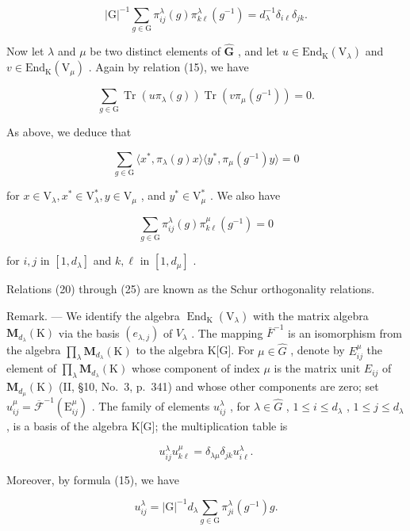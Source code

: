 \[
| \mathrm{G} | ^ {- 1} \sum_ {g \in \mathrm{G}} \pi_ {i j} ^ {\lambda} (g) \pi_ {k \ell} ^ {\lambda} (g ^ {- 1}) = d _ {\lambda} ^ {- 1} \delta_ {i \ell} \delta_ {j k}.\tag{22}
\]

Now let \(\lambda\) and \(\mu\) be two distinct elements of \(\widehat{\mathbf{G}}\) , and let \(u \in \mathrm{End}_{\mathrm{K}}(\mathrm{V}_{\lambda})\) and \(v \in \mathrm{End}_{\mathrm{K}}(\mathrm{V}_{\mu})\) . Again by relation (15), we have

\[
\sum_ {g \in \mathrm{G}} \operatorname{Tr} (u \pi_ {\lambda} (g)) \operatorname{Tr} (v \pi_ {\mu} (g ^ {- 1})) = 0.\tag{23}
\]

As above, we deduce that

\[
\sum_ {g \in \mathrm{G}} \langle x ^ {*}, \pi_ {\lambda} (g) x \rangle \langle y ^ {*}, \pi_ {\mu} (g ^ {- 1}) y \rangle = 0\tag{24}
\]

for \(x\in \mathrm{V}_{\lambda},x^{*}\in \mathrm{V}_{\lambda}^{*},y\in \mathrm{V}_{\mu}\) , and \(y^{*}\in \mathrm{V}_{\mu}^{*}\) . We also have

\[
\sum_ {g \in \mathrm{G}} \pi_ {i j} ^ {\lambda} (g) \pi_ {k \ell} ^ {\mu} (g ^ {- 1}) = 0\tag{25}
\]

for \(i,j\) in \([1,d_{\lambda}]\) and \(k,\ell\) in \([1,d_{\mu}]\) .

Relations (20) through (25) are known as the Schur orthogonality relations.

Remark. --- We identify the algebra \(\operatorname{End}_{\mathrm{K}}(\mathrm{V}_{\lambda})\) with the matrix algebra \(\mathbf{M}_{d_{\lambda}}(\mathrm{K})\) via the basis \((e_{\lambda,j})\) of \(V_{\lambda}\) . The mapping \(\overline{F}^{-1}\) is an isomorphism from the algebra \(\prod_{\lambda}\mathbf{M}_{d_{\lambda}}(\mathrm{K})\) to the algebra K{[}G{]}. For \(\mu\in\widehat{G}\) , denote by \(E_{ij}^{\mu}\) the element of \(\prod_{\lambda}\mathbf{M}_{d_{\lambda}}(\mathrm{K})\) whose component of index \(\mu\) is the matrix unit \(E_{ij}\) of \(\mathbf{M}_{d_{\mu}}(\mathrm{K})\) (II, §10, No.~3, p.~341) and whose other components are zero; set \(u_{ij}^{\mu}=\overline{\mathcal{F}}^{-1}(\mathrm{E}_{ij}^{\mu})\) . The family of elements \(u_{ij}^{\lambda}\) , for \(\lambda\in\widehat{G}\) , \(1\leqslant i\leqslant d_{\lambda}\) , \(1\leqslant j\leqslant d_{\lambda}\) , is a basis of the algebra K{[}G{]}; the multiplication table is

\[
u _ {i j} ^ {\lambda} u _ {k \ell} ^ {\mu} = \delta_ {\lambda \mu} \delta_ {j k} u _ {i \ell} ^ {\lambda}.\tag{26}
\]

Moreover, by formula (15), we have

\[
u _ {i j} ^ {\lambda} = | \mathrm{G} | ^ {- 1} d _ {\lambda} \sum_ {g \in \mathrm{G}} \pi_ {j i} ^ {\lambda} (g ^ {- 1}) g.\tag{27}
\]

